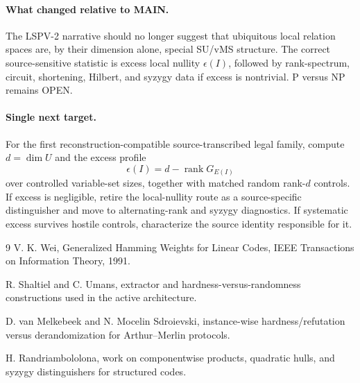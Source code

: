 \documentclass[11pt]{article}
\begin{document}
\paragraph{What changed relative to MAIN.}
The LSPV-2 narrative should no longer suggest that ubiquitous local relation spaces are, by their dimension alone, special SU/vMS structure. The correct source-sensitive statistic is excess local nullity \(\epsilon(I)\), followed by rank-spectrum, circuit, shortening, Hilbert, and syzygy data if excess is nontrivial. P versus NP remains OPEN.

\paragraph{Single next target.}
For the first reconstruction-compatible source-transcribed legal family, compute \(d=\dim U\) and the excess profile
\[
\epsilon(I)=d-\operatorname{rank}G_{E(I)}
\]
over controlled variable-set sizes, together with matched random rank-\(d\) controls. If excess is negligible, retire the local-nullity route as a source-specific distinguisher and move to alternating-rank and syzygy diagnostics. If systematic excess survives hostile controls, characterize the source identity responsible for it.

\begin{thebibliography}{9}
V. K. Wei, Generalized Hamming Weights for Linear Codes, IEEE Transactions on Information Theory, 1991.

R. Shaltiel and C. Umans, extractor and hardness-versus-randomness constructions used in the active architecture.

D. van Melkebeek and N. Mocelin Sdroievski, instance-wise hardness/refutation versus derandomization for Arthur--Merlin protocols.

H. Randriambololona, work on componentwise products, quadratic hulls, and syzygy distinguishers for structured codes.
\end{thebibliography}
\end{document}
